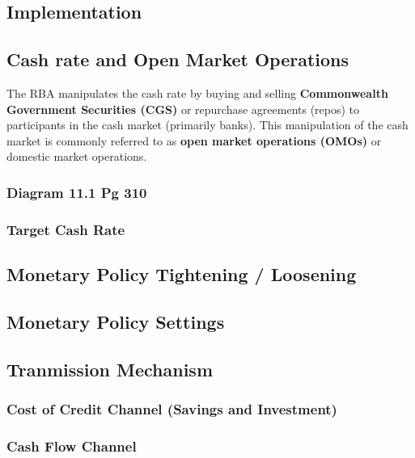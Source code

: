 \documentclass[11pt]{article}
\begin{document}
\subsection{Implementation}
\label{sec-3-4}

\subsection{Cash rate and Open Market Operations}
\label{sec-3-5}

The RBA manipulates the cash rate by buying and selling \textbf{Commonwealth
Government Securities (CGS)} or repurchase agreements (repos) to
participants in the cash market (primarily banks). This manipulation
of the cash market is commonly referred to as \textbf{open market operations
(OMOs)} or domestic market operations.

\subsubsection{Diagram 11.1 Pg 310}
\label{sec-3-5-1}

\subsubsection{Target Cash Rate}
\label{sec-3-5-2}

\subsection{Monetary Policy Tightening / Loosening}
\label{sec-3-6}



\subsection{Monetary Policy Settings}
\label{sec-3-7}

\subsection{Tranmission Mechanism}
\label{sec-3-8}

\subsubsection{Cost of Credit Channel (Savings and Investment)}
\label{sec-3-8-1}

\subsubsection{Cash Flow Channel}
\label{sec-3-8-2}
\end{document}
